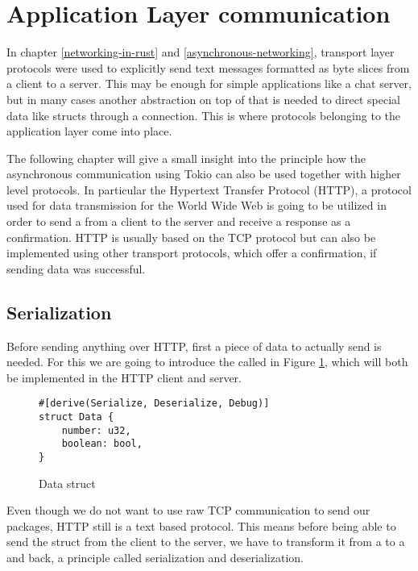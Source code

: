 
\section{Application Layer communication} \label{application-layer-communication}
In chapter \ref{networking-in-rust} and \ref{asynchronous-networking}, transport layer protocols were used to
explicitly send text messages formatted as byte slices from a client to a server. This may be enough for simple
applications like a chat server, but in many cases another abstraction on top of that is needed to direct special data
like structs through a connection. This is where protocols belonging to the application layer come into place.

The following chapter will give a small insight into the principle how the asynchronous communication using Tokio can
also be used together with higher level protocols. In particular the Hypertext Transfer Protocol (HTTP), a protocol
used for data transmission for the World Wide Web is going to be utilized in order to send a  from a
client to the server and receive a response as a confirmation. HTTP is usually based on the TCP protocol but can also
be implemented using other transport protocols, which offer a confirmation, if sending data was successful.

\subsection{Serialization}
Before sending anything over HTTP, first a piece of data to actually send is needed. For this we are going to introduce
the  called  in Figure \ref{data-struct}, which will both be implemented in the HTTP client and
server.

\begin{figure}[ht]
    \begin{verbatim}
#[derive(Serialize, Deserialize, Debug)]
struct Data {
    number: u32,
    boolean: bool,
}
    \end{verbatim}
    \caption{Data struct}
    \label{data-struct}
\end{figure}

Even though we do not want to use raw TCP communication to send our packages, HTTP still is a text based protocol. This
means before being able to send the struct from the client to the server, we have to transform it from a 
to a  and back, a principle called serialization and deserialization.

